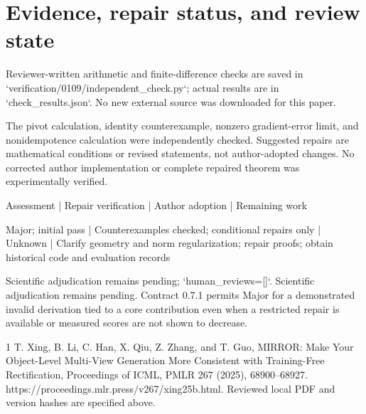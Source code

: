 \documentclass[10pt]{article}
\begin{document}
\section*{Evidence, repair status, and review state}
Reviewer-written arithmetic and finite-difference checks are saved in `verification/0109/independent\_check.py`; actual results are in `check\_results.json`. No new external source was downloaded for this paper.\par
The pivot calculation, identity counterexample, nonzero gradient-error limit, and nonidempotence calculation were independently checked. Suggested repairs are mathematical conditions or revised statements, not author-adopted changes. No corrected author implementation or complete repaired theorem was experimentally verified.\par
Assessment | Repair verification | Author adoption | Remaining work\par
Major; initial pass | Counterexamples checked; conditional repairs only | Unknown | Clarify geometry and norm regularization; repair proofs; obtain historical code and evaluation records\par
Scientific adjudication remains pending; `human\_reviews=[]`. Scientific adjudication remains pending. Contract 0.7.1 permits Major for a demonstrated invalid derivation tied to a core contribution even when a restricted repair is available or measured scores are not shown to decrease.\par
1 T. Xing, B. Li, C. Han, X. Qiu, Z. Zhang, and T. Guo, MIRROR: Make Your Object-Level Multi-View Generation More Consistent with Training-Free Rectification, Proceedings of ICML, PMLR 267 (2025), 68900–68927. https://proceedings.mlr.press/v267/xing25b.html. Reviewed local PDF and version hashes are specified above.\par
\end{document}

